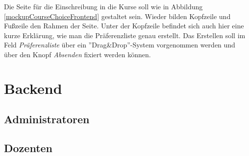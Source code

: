 Die Seite für die Einschreibung in die Kurse soll wie in Abbildung \ref{mockupCourseChoiceFrontend} gestaltet sein.
Wieder bilden Kopfzeile und Fußzeile den Rahmen der Seite.
Unter der Kopfzeile befindet sich auch hier eine kurze Erklärung, wie man die Präferenzliste genau erstellt.
Das Erstellen soll im Feld \textit{Präferenzliste} über ein ''Drag\&Drop''-System vorgenommen werden und über den Knopf \textit{Absenden} fixiert werden können.




\section{Backend}
	\subsection{Administratoren}
	\subsection{Dozenten}